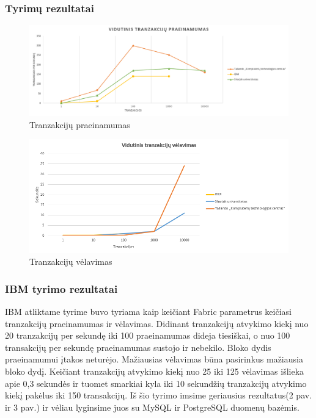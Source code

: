 \documentclass{VUMIFPSkursinis}
\begin{document}
		\subsubsection{Tyrimų rezultatai}
			\begin{figure}[H]
			    \centering
			    \includegraphics[scale=0.5]{img/Praein}
			    \caption{Tranzakcijų praeinamumas}   %
			    \label{img:mlp}
			\end{figure}		
			\begin{figure}[H]
			    \centering
			    \includegraphics[scale=0.5]{img/Velav}
			    \caption{Tranzakcijų vėlavimas}   %
			    \label{img:mlp}
			\end{figure}		
		\subsubsection{IBM tyrimo rezultatai}
			IBM atliktame tyrime \cite{IMBResearch} buvo tyriama kaip keičiant Fabric parametrus keičiasi tranzakcijų praeinamumas ir vėlavimas. Didinant tranzakcijų atvykimo kiekį nuo 20 tranzakcijų per sekundę iki 100 praeinamumas dideja tiesiškai, o nuo 100 transakcijų per sekundę praeinamumas sustojo ir nebekilo. Bloko dydis praeinamumui įtakos neturėjo. 
			\newline
			Mažiausias vėlavimas būna pasirinkus mažiausia bloko dydį. Keičiant tranzakcijų atvykimo kiekį nuo 25 iki 125 vėlavimas išlieka apie 0,3 sekundės ir tuomet smarkiai kyla iki 10 sekundžių tranzakcijų 
			atvykimo kiekį pakėlus iki 150 transakcijų. 
			\newline
			Iš šio tyrimo imsime geriausius rezultatus(2 pav. ir 3 pav.) ir vėliau lyginsime juos su MySQL ir PostgreSQL duomenų bazėmis. 
\end{document}

